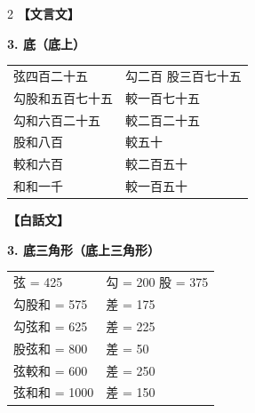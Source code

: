 \documentclass[11pt,a4paper]{article}
\begin{document}
\begin{paracol}{2}
\textbf{【文言文】}

\textbf{3. 底（底上）}

\begin{center}
\begin{tabular}{ll}
弦四百二十五 & 勾二百 \quad 股三百七十五 \\
勾股和五百七十五 & 較一百七十五 \\
勾和六百二十五 & 較二百二十五 \\
股和八百 & 較五十 \\
較和六百 & 較二百五十 \\
和和一千 & 較一百五十 \\
\end{tabular}
\end{center}

\switchcolumn
\textbf{【白話文】}

\textbf{3. 底三角形（底上三角形）}

\begin{center}
\begin{tabular}{ll}
弦 = 425 & 勾 = 200 \quad 股 = 375 \\
勾股和 = 575 & 差 = 175 \\
勾弦和 = 625 & 差 = 225 \\
股弦和 = 800 & 差 = 50 \\
弦較和 = 600 & 差 = 250 \\
弦和和 = 1000 & 差 = 150 \\
\end{tabular}
\end{center}
\end{paracol}
\end{document}
